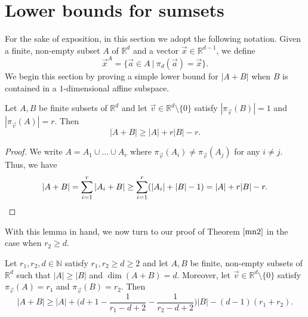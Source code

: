 \section{Lower bounds for sumsets} 

For the sake of exposition, in this section we adopt the following notation. Given a finite, non-empty subset $A$ of $\mathbb{R}^d$ and a vector $\vec{x} \in \mathbb{R}^{d-1}$, we define
\[ \vec{x}^A = \{ \vec{a} \in A \ | \ \pi_d(\vec{a}) = \vec{x} \}. \]
We begin this section by proving a simple lower bound for $|A+B|$ when $B$ is contained in a $1$-dimensional affine subspace.

\begin{lemma} \label{d12}
Let $A,B$ be finite subsets of $\mathbb{R}^d$ and let $\vec{v} \in \mathbb{R}^d \setminus \{0\}$ satisfy $|\pi_{\vec{v}}(B)| =1$ and $|\pi_{\vec{v}}(A)| = r$. Then
\[ |A+ B| \geq |A| + r|B| - r. \]
\end{lemma}

\begin{proof}
We write $A = A_1 \cup \dots \cup A_{r}$ where $\pi_{\vec{v}}(A_i) \neq \pi_{\vec{v}}(A_j)$ for any $i \neq j$. Thus, we have
\[ |A+B| = \sum_{i=1}^{r}|A_i + B| \geq \sum_{i=1}^{r} (|A_i| + |B| -1 ) = |A| + r |B| - r. \qedhere \]
\end{proof}

With this lemma in hand, we now turn to our proof of Theorem $\ref{mn2}$ in the case when $r_2 \geq d$.

\begin{theorem} \label{rszgn}
Let $r_1, r_2, d \in \mathbb{N}$ satisfy $r_1,r_2 \geq d\geq 2$ and let $A,B$ be finite, non-empty subsets of $\mathbb{R}^d$ such that $|A| \geq |B|$ and $\dim(A+B) = d$. Moreover, let $\vec{v} \in \mathbb{R}^d \setminus \{0\}$ satisfy $\pi_{\vec{v}}(A) = r_1$ and $\pi_{\vec{v}}(B) = r_2$. Then 
\[ |A+B| \geq |A| + \bigg( d+1 - \frac{1}{r_1 - d + 2} - \frac{1}{r_2 - d + 2} \bigg)|B| - (d-1)(r_1 + r_2).  \]
\end{theorem}

